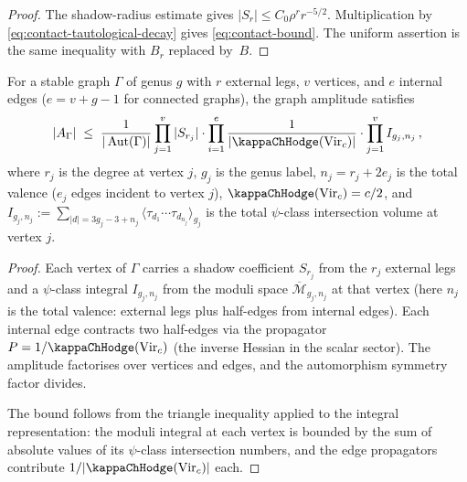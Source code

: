 \begin{proof}
The shadow-radius estimate gives
$|S_r|\leq C_0\rho^r r^{-5/2}$. Multiplication by
\eqref{eq:contact-tautological-decay} gives
\eqref{eq:contact-bound}. The uniform assertion is the same
inequality with $B_r$ replaced by~$B$.
\end{proof}

\begin{proposition}
\label{prop:multi-vertex-bound}
For a stable graph $\Gamma$ of genus $g$ with $r$ external
legs, $v$ vertices, and $e$ internal edges ($e = v + g - 1$
for connected graphs), the graph amplitude satisfies
\begin{equation}\label{eq:multi-vertex-amplitude-bound}
|A_\Gamma| \;\leq\;
\frac{1}{|\Aut(\Gamma)|}
\prod_{j=1}^v |S_{r_j}|
\cdot \prod_{i=1}^e \frac{1}{|\kappaChHodge(\mathrm{Vir}_c)|}
\cdot
\prod_{j=1}^v I_{g_j, n_j}\,,
\end{equation}
where $r_j$ is the degree at vertex $j$,
$g_j$ is the genus label, $n_j = r_j + 2e_j$ is the
total valence \textup{(}$e_j$ edges incident to vertex $j$\textup{)},
$\kappaChHodge(\mathrm{Vir}_c) = c/2$, and
$I_{g_j,n_j} := \sum_{|d|=3g_j-3+n_j}
\langle \tau_{d_1} \cdots \tau_{d_{n_j}} \rangle_{g_j}$
is the total $\psi$-class intersection volume at vertex $j$.
\end{proposition}

\begin{proof}
Each vertex of $\Gamma$ carries a shadow coefficient $S_{r_j}$
from the $r_j$ external legs and a $\psi$-class integral
$I_{g_j, n_j}$ from the moduli space
$\overline{\mathcal{M}}_{g_j, n_j}$ at that vertex (here $n_j$
is the total valence: external legs plus half-edges from
internal edges). Each internal edge contracts two half-edges
via the propagator $P = 1/\kappaChHodge(\mathrm{Vir}_c)$ (the inverse Hessian in the
scalar sector). The amplitude factorises over vertices and
edges, and the automorphism symmetry factor divides.

The bound follows from the triangle inequality applied to the
integral representation: the moduli integral at each vertex is
bounded by the sum of absolute values of its $\psi$-class
intersection numbers, and the edge propagators contribute
$1/|\kappaChHodge(\mathrm{Vir}_c)|$ each.
\end{proof}

